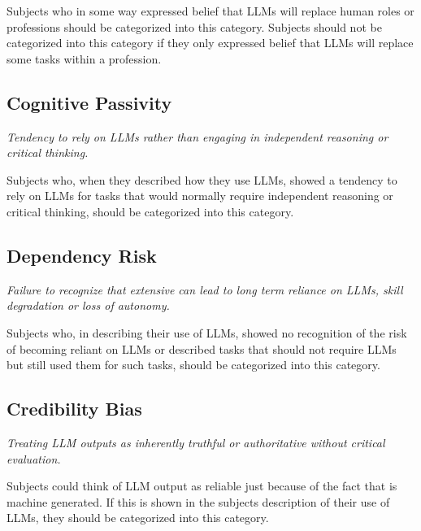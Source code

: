 Subjects who in some way expressed belief that LLMs will replace human roles or professions should be categorized into this category. Subjects should not be categorized into this category if they only expressed belief that LLMs will replace some tasks within a profession.

\subsection*{Cognitive Passivity}

\textit{Tendency to rely on LLMs rather than engaging in independent reasoning or critical thinking.}

Subjects who, when they described how they use LLMs, showed a tendency to rely on LLMs for tasks that would normally require independent reasoning or critical thinking, should be categorized into this category.

\subsection*{Dependency Risk}

\textit{Failure to recognize that extensive can lead to long term reliance on LLMs, skill degradation or loss of autonomy.}

Subjects who, in describing their use of LLMs, showed no recognition of the risk of becoming reliant on LLMs or described tasks that should not require LLMs but still used them for such tasks, should be categorized into this category.

\subsection*{Credibility Bias}

\textit{Treating LLM outputs as inherently truthful or authoritative without critical evaluation.}

Subjects could think of LLM output as reliable just because of the fact that is machine generated. If this is shown in the subjects description of their use of LLMs, they should be categorized into this category.

